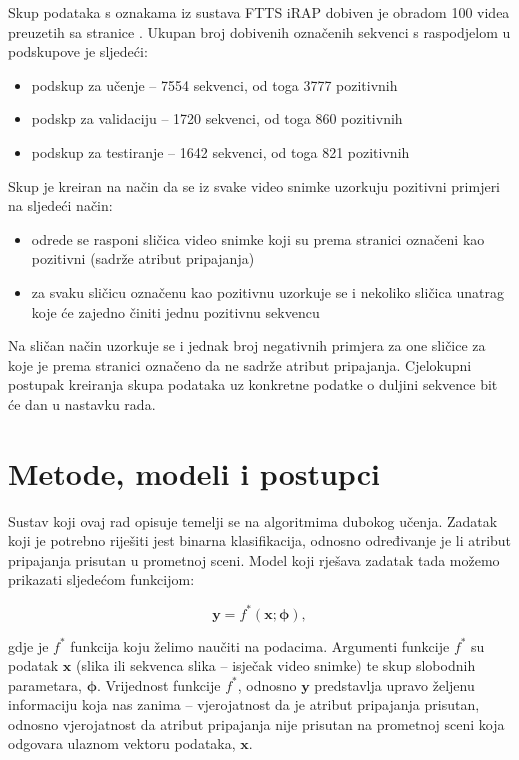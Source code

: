 \documentclass[times, utf8, diplomski, numeric]{fer}
\begin{document}
Skup podataka s oznakama iz sustava FTTS iRAP dobiven je obradom 100 videa preuzetih sa stranice \citep{url:ftts_irap}. 
Ukupan broj dobivenih označenih sekvenci s raspodjelom u podskupove je sljedeći:
\begin{itemize}
 \item podskup za učenje -- 7554 sekvenci, od toga 3777 pozitivnih
 \item podskp za validaciju -- 1720 sekvenci, od toga 860 pozitivnih
 \item podskup za testiranje -- 1642 sekvenci, od toga 821 pozitivnih
\end{itemize}

\noindent Skup je kreiran na način da se iz svake video snimke uzorkuju pozitivni primjeri na sljedeći način: 
\begin{itemize}
 \item odrede se rasponi sličica video snimke koji su prema stranici \citep{url:ftts_irap} označeni kao pozitivni (sadrže atribut pripajanja)
 \item za svaku sličicu označenu kao pozitivnu uzorkuje se i nekoliko sličica unatrag koje će zajedno činiti jednu pozitivnu sekvencu
\end{itemize}

\noindent Na sličan način uzorkuje se i jednak broj negativnih primjera za one sličice za koje je prema stranici \citep{url:ftts_irap} označeno da ne sadrže atribut pripajanja.
Cjelokupni postupak kreiranja skupa podataka uz konkretne podatke o duljini sekvence bit će dan u nastavku rada.

\chapter{Metode, modeli i postupci} \label{chapter:methods}
Sustav koji ovaj rad opisuje temelji se na algoritmima dubokog učenja. 
Zadatak koji je potrebno riješiti jest binarna klasifikacija, odnosno određivanje je li atribut pripajanja prisutan u prometnoj sceni.
Model koji rješava zadatak tada možemo prikazati sljedećom funkcijom:

\begin{equation}
 \mathbf{y} = f^*(\mathbf{x}; \boldsymbol{\phi}),
\end{equation}

\noindent gdje je $f^*$ funkcija koju želimo naučiti na podacima. Argumenti funkcije $f^*$ su podatak $\mathbf{x}$ (slika ili sekvenca slika -- isječak video snimke) te skup slobodnih parametara, $\boldsymbol{\phi}$.
Vrijednost funkcije $f^*$, odnosno $\mathbf{y}$ predstavlja upravo željenu informaciju koja nas zanima -- vjerojatnost da je atribut pripajanja prisutan, odnosno vjerojatnost da atribut pripajanja nije prisutan na prometnoj sceni koja odgovara ulaznom vektoru podataka, $\mathbf{x}$.
\end{document}
